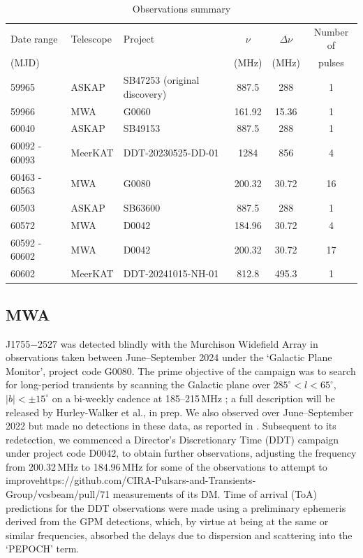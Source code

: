 \documentclass[fleqn,usenatbib]{mnras}
\newcommand{\src}{J1755$-$2527}
\begin{document}
\begin{table}
  \centering
  \caption{Observations summary}
  \label{tbl:obs}
  \begin{tabular}{lllccc}
    \hline
    Date range & Telescope & Project & $\nu$ & $\Delta\nu$ & Number of \\ 
    (MJD) & & & (MHz) & (MHz) & pulses \\
    \hline 
    59965 & ASKAP & SB47253 (original discovery) & 887.5 & 288 & 1 \\
    59966 & MWA & G0060 & 161.92 & 15.36 & 1 \\
    60040  & ASKAP & SB49153 & 887.5 & 288 & 1 \\
    60092 - 60093 & MeerKAT & DDT-20230525-DD-01 & 1284 & 856 & 4 \\
    60463 - 60563 & MWA & G0080 & 200.32 & 30.72 & 16 \\
    60503 & ASKAP & SB63600 & 887.5 & 288 & 1 \\
    60572 & MWA & D0042 & 184.96 & 30.72 & 4 \\
    60592 - 60602 & MWA & D0042 & 200.32 & 30.72 & 17 \\
    60602 & MeerKAT & DDT-20241015-NH-01 & 812.8 & 495.3 & 1 \\
    \hline
  \end{tabular}
\end{table}

\subsection{MWA} \label{sec:mwa}

\src{} was detected blindly with the Murchison Widefield Array \citep[MWA;][]{Tingay2013} in observations taken between June--September 2024 under the `Galactic Plane Monitor', project code G0080. The prime objective of the campaign was to search for long-period transients by scanning the Galactic plane over $285^\circ < l < 65^\circ$, $|b|<\pm15^\circ$ on a bi-weekly cadence at 185--215\,MHz \citep[see Methods of][]{2023Natur.619..487H}; a full description will be released by Hurley-Walker et al., in prep. We also observed over June--September 2022 but made no detections in these data, as reported in .
Subsequent to its redetection, we commenced a Director's Discretionary Time (DDT) campaign under project code D0042, to obtain further observations, adjusting the frequency from 200.32\,MHz to 184.96\,MHz for some of the observations to attempt to improvehttps://github.com/CIRA-Pulsars-and-Transients-Group/vcsbeam/pull/71 measurements of its DM.
Time of arrival (ToA) predictions for the DDT observations were made using a preliminary ephemeris derived from the GPM detections, which, by virtue at being at the same or similar frequencies, absorbed the delays due to dispersion and scattering into the `PEPOCH' term.
\end{document}
